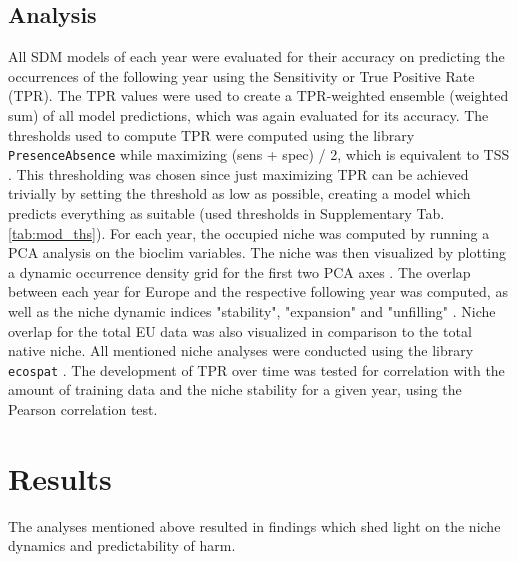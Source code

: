 \documentclass[12pt,a4paper]{article}
\begin{document}
\subsection{Analysis} \label{ssec:analysis}
All SDM models of each year were evaluated for their accuracy on predicting the occurrences of the following year using the Sensitivity or True Positive Rate (TPR).
The TPR values were used to create a TPR-weighted ensemble (weighted sum) of all model predictions, which was again evaluated for its accuracy.
The thresholds used to compute TPR were computed using the library \texttt{PresenceAbsence} \autocite{freeman2008presenceabsence} while maximizing (sens + spec) / 2, which is equivalent to TSS \autocite{allouche2006TSS}. 
This thresholding was chosen since just maximizing TPR can be achieved trivially by setting the threshold as low as possible, creating a model which predicts everything as suitable (used thresholds in Supplementary Tab. \ref{tab:mod_ths}).
For each year, the occupied niche was computed by running a PCA analysis on the bioclim variables.
The niche was then visualized by plotting a dynamic occurrence density grid for the first two PCA axes \autocite{broennimann2012niche}.
The overlap between each year for Europe and the respective following year was computed, as well as the niche dynamic indices "stability", "expansion" and "unfilling" \autocite{guisan2014nichedyn}.
Niche overlap for the total EU data was also visualized in comparison to the total native niche.
All mentioned niche analyses were conducted using the library \texttt{ecospat} \autocite{dicola2017ecospat}.
The development of TPR over time was tested for correlation with the amount of training data and the niche stability for a given year, using the Pearson correlation test.

\newpage
\section{Results} \label{sec:results}
The analyses mentioned above resulted in findings which shed light on the niche dynamics and predictability of \gls{harm}. 
\end{document}

